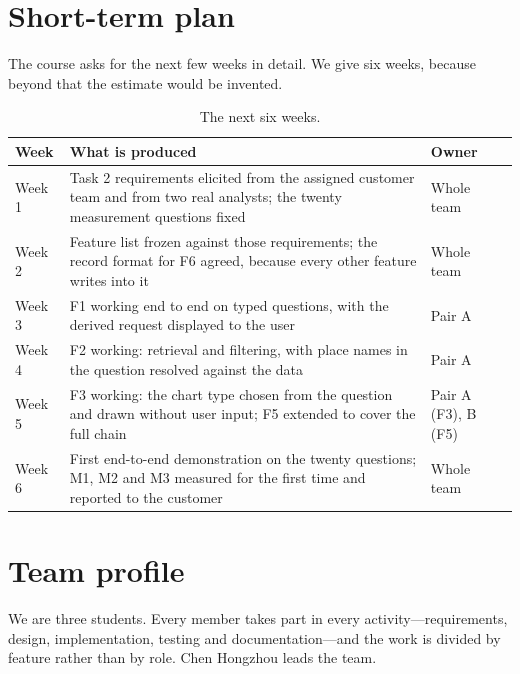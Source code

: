 \documentclass[12pt,a4paper]{report}
\begin{document}
\section{Short-term plan}
\label{sec:short-term}

The course asks for the next few weeks in detail. We give six weeks, because
beyond that the estimate would be invented.

\begin{table}[H]
  \centering
  \caption{The next six weeks.}
  \label{tab:shortterm}
  \begin{tabular}{@{}p{1.7cm}p{9.3cm}p{4.0cm}@{}}
    \toprule[1.5pt]
    \textbf{Week} & \textbf{What is produced} & \textbf{Owner} \\
    \midrule
    Week 1 & Task 2 requirements elicited from the assigned customer team and
      from two real analysts; the twenty measurement questions fixed &
      Whole team \\
    \addlinespace
    Week 2 & Feature list frozen against those requirements; the record format
      for F6 agreed, because every other feature writes into it &
      Whole team \\
    \addlinespace
    Week 3 & F1 working end to end on typed questions, with the derived request
      displayed to the user &
      Pair A \\
    \addlinespace
    Week 4 & F2 working: retrieval and filtering, with place names in the
      question resolved against the data &
      Pair A \\
    \addlinespace
    Week 5 & F3 working: the chart type chosen from the question and drawn
      without user input; F5 extended to cover the full chain &
      Pair A (F3), B (F5) \\
    \addlinespace
    Week 6 & First end-to-end demonstration on the twenty questions; M1, M2 and
      M3 measured for the first time and reported to the customer &
      Whole team \\
    \bottomrule[1.5pt]
  \end{tabular}
\end{table}

\section{Team profile}

We are three students. Every member takes part in every activity---requirements,
design, implementation, testing and documentation---and the work is divided by
feature rather than by role. Chen Hongzhou leads the team.
\end{document}
